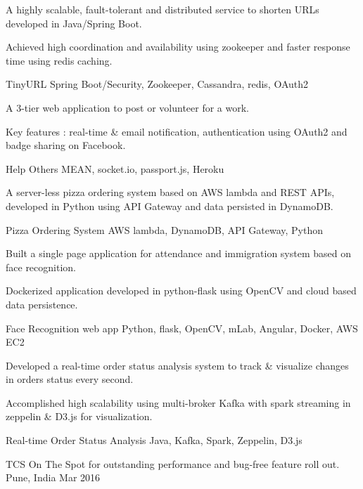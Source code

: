\documentclass[]{awesome-cv}
\begin{document}
\begin{cventries}
	\cvprojectentry
	{
	\begin{cvitems}
    	\item {A highly scalable, fault-tolerant and distributed service to shorten URLs developed in Java/Spring Boot. }
    	\item {Achieved high coordination and availability using zookeeper and faster response time using redis caching.}
	\end{cvitems}
	}
	{TinyURL}
	{Spring Boot/Security, Zookeeper, Cassandra, redis, OAuth2}
	\cvprojectentry
	{
	\begin{cvitems}
    	\item {A 3-tier web application to post or volunteer for a work.}
    	\item {Key features : real-time \& email notification, authentication using OAuth2 and badge sharing on Facebook.}
	\end{cvitems}
	}
	{Help Others}
	{MEAN, socket.io, passport.js, Heroku}
	\cvprojectentry
	{
	\begin{cvitems}
    	\item {A server-less pizza ordering system based on AWS lambda and REST APIs, developed in Python using API Gateway and data persisted in DynamoDB.}
	\end{cvitems}
	}
	{Pizza Ordering System}
	{AWS lambda, DynamoDB, API Gateway, Python}
	\cvprojectentry
	{
	\begin{cvitems}
    	\item {Built a single page application for attendance and immigration system based on face recognition.}
    	\item {Dockerized application developed in python-flask using OpenCV and cloud based data persistence.}
	\end{cvitems}
	}
	{Face Recognition web app}
	{Python, flask, OpenCV, mLab, Angular, Docker, AWS EC2}
	\cvprojectentry
	{
	\begin{cvitems}
    	\item {Developed a real-time order status analysis system to track \& visualize changes in orders status every second.}
    	\item {Accomplished high scalability using multi-broker Kafka with spark streaming in zeppelin & D3.js for visualization.}
	\end{cvitems}
	}
	{Real-time Order Status Analysis}
	{Java, Kafka, Spark, Zeppelin, D3.js}
    \vspace{-2mm}
\end{cventries}
\vspace{-3mm}
\begin{cvhonors}
	\cvhonor
	{TCS On The Spot}
	{for outstanding performance and bug-free feature roll out.}
	{Pune, India}
	{Mar 2016}
\end{cvhonors}
\ 
\end{document}
